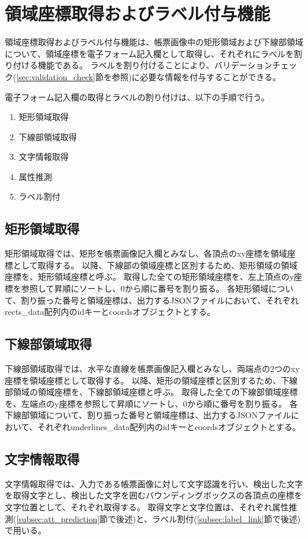 \section{領域座標取得およびラベル付与機能}\label{sec:eform_write_space_obtainment_feature}
領域座標取得およびラベル付与機能は、帳票画像中の矩形領域および下線部領域について、領域座標を電子フォーム記入欄として取得し、それぞれにラベルを割り付ける機能である。
ラベルを割り付けることにより、バリデーションチェック(\ref{sec:validation_check}節を参照)に必要な情報を付与することができる。

電子フォーム記入欄の取得とラベルの割り付けは、以下の手順で行う。

\begin{enumerate}
    \item 矩形領域取得
    \item 下線部領域取得
    \item 文字情報取得
    \item 属性推測
    \item ラベル割付
\end{enumerate}

\subsection{矩形領域取得}\label{subsec:rect_coords_obtainment}
矩形領域取得では、矩形を帳票画像記入欄とみなし、各頂点のxy座標を領域座標として取得する。
以降、下線部の領域座標と区別するため、矩形領域の領域座標を、矩形領域座標と呼ぶ。
取得した全ての矩形領域座標を、左上頂点のy座標を参照して昇順にソートし、0から順に番号を割り振る。
各矩形領域について、割り振った番号と領域座標は、出力するJSONファイルにおいて、それぞれrects\_data配列内のidキーとcoordsオブジェクトとする。

\subsection{下線部領域取得}\label{subsec:underline_coords_obtainment}
下線部領域取得では、水平な直線を帳票画像記入欄とみなし、両端点の2つのxy座標を領域座標として取得する。
以降、矩形の領域座標と区別するため、下線部領域の領域座標を、下線部領域座標と呼ぶ。
取得した全ての下線部領域座標を、左端点のy座標を参照して昇順にソートし、0から順に番号を割り振る。
各下線部領域について、割り振った番号と領域座標は、出力するJSONファイルにおいて、それぞれunderlines\_data配列内のidキーとcoordsオブジェクトとする。

\subsection{文字情報取得}\label{subsec:char_information_obtainment}
文字情報取得では、入力である帳票画像に対して文字認識を行い、検出した文字を取得文字とし、検出した文字を囲むバウンディングボックスの各頂点の座標を文字位置として、それぞれ取得する。
取得文字と文字位置は、それぞれ属性推測(\ref{subsec:att_prediction}節で後述)と、ラベル割付(\ref{subsec:label_link}節で後述)で用いる。

